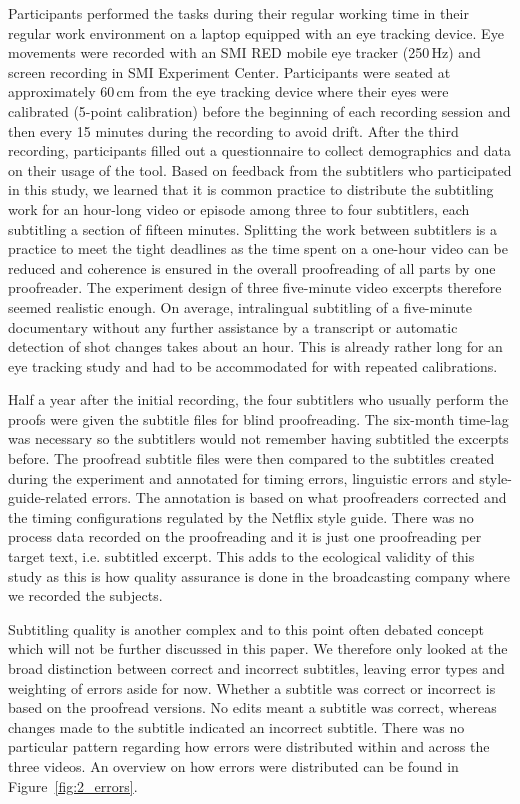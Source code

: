 \documentclass[output=paper]{langscibook}
\begin{document}
Participants performed the tasks during their regular working time in their regular work environment on a laptop equipped with an eye tracking device.
Eye movements were recorded with an SMI RED mobile eye tracker (250\,Hz) and screen recording in SMI Experiment Center.
Participants were seated at approximately 60\,cm from the eye tracking device where their eyes were calibrated (5-point calibration) before the beginning of each recording session and then every 15 minutes during the recording to avoid drift.
After the third recording, participants filled out a questionnaire to collect demographics and data on their usage of the tool.
Based on feedback from the subtitlers who participated in this study, we learned that it is common practice to distribute the subtitling work for an hour-long video or episode among three to four subtitlers, each subtitling a section of fifteen minutes.
Splitting the work between subtitlers is a practice to meet the tight deadlines as the time spent on a one-hour video can be reduced and coherence is ensured in the overall proofreading of all parts by one proofreader.
The experiment design of three five-minute video excerpts therefore seemed realistic enough.
On average, intralingual subtitling of a five-minute documentary without any further assistance by a transcript or automatic detection of shot changes takes about an hour.
This is already rather long for an eye tracking study and had to be accommodated for with repeated calibrations.

Half a year after the initial recording, the four subtitlers who usually perform the proofs were given the subtitle files for blind proofreading.
The six-month time-lag was necessary so the subtitlers would not remember having subtitled the excerpts before.
The proofread subtitle files were then compared to the subtitles created during the experiment and annotated for timing errors, linguistic errors and style-guide-related errors.
The annotation is based on what proofreaders corrected and the timing configurations regulated by the Netflix style guide.
There was no process data recorded on the proofreading and it is just one proofreading per target text, i.e. subtitled excerpt.
This adds to the ecological validity of this study as this is how quality assurance is done in the broadcasting company where we recorded the subjects.

Subtitling quality is another complex and to this point often debated concept which will not be further discussed in this paper.
We therefore only looked at the broad distinction between correct and incorrect subtitles, leaving error types and weighting of errors aside for now.
Whether a subtitle was correct or incorrect is based on the proofread versions.
No edits meant a subtitle was correct, whereas changes made to the subtitle indicated an incorrect subtitle.
There was no particular pattern regarding how errors were distributed within and across the three videos.
An overview on how errors were distributed can be found in Figure~\ref{fig:2_errors}.
\end{document}
